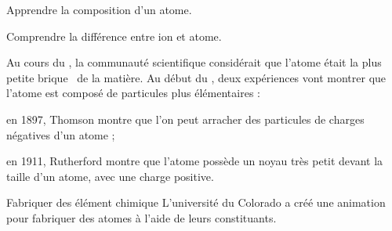 \teteSndAtom

\vspace*{-44pt}


\begin{objectifs}
  \item Apprendre la composition d'un atome.
  \item Comprendre la différence entre ion et atome.
\end{objectifs}

\begin{contexte}
  Au cours du , la communauté scientifique considérait que l'atome était la plus petite \og brique \fg\, de la matière.
  Au début du , deux expériences vont montrer que l'atome est composé de particules plus élémentaires :
  \begin{listePoints}
    \item en 1897, Thomson montre que l'on peut arracher des particules de charges négatives d'un atome ;
    \item en 1911, Rutherford montre que l'atome possède un noyau très petit devant la taille d'un atome, avec une charge positive.
  \end{listePoints}
  
\end{contexte}


\begin{doc}{Fabriquer des élément chimique}
  L'université du Colorado a créé une animation pour fabriquer des atomes à l'aide de leurs constituants.
  
\end{doc}




\begin{flushleft}  
\end{flushleft}

\vspace*{-30pt}

